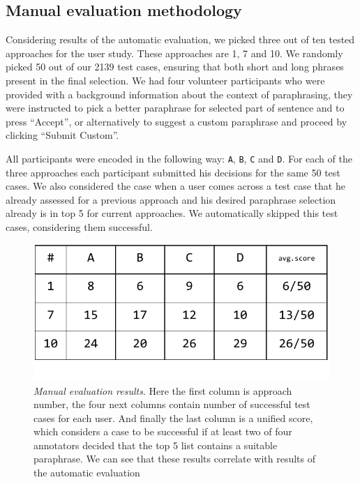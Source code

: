 \subsection{Manual evaluation methodology}

Considering results of the automatic evaluation, we picked three out of ten tested approaches for the user study. These approaches are 1, 7 and 10. We randomly picked 50 out of our 2139 test cases, ensuring that both short and long phrases present in the final selection. We had four volunteer participants who were provided with a background information about the context of paraphrasing, they were instructed to pick a better paraphrase for selected part of sentence and to press ``Accept'', or alternatively to suggest a custom paraphrase and proceed by clicking ``Submit Custom''. 

All participants were encoded in the following way: \texttt{A}, \texttt{B}, \texttt{C} and \texttt{D}. For each of the three approaches each participant submitted his decisions for the same 50 test cases. We also considered the case when a user comes across a test case that he already assessed for a previous approach and his desired paraphrase selection already is in top 5 for current approaches. We automatically skipped this test cases, considering them successful. 

\begin{figure}
 \centering 
 \includegraphics[scale=0.8]{g/man-eval-result.pdf}
 \caption{\emph{Manual evaluation results}. Here the first column is approach number, the four next columns contain number of successful test cases for each user. And finally the last column is a unified score, which considers a case to be successful if at least two of four annotators decided that the top 5 list contains a suitable paraphrase. We can see that these results correlate with results of the automatic evaluation}
\end{figure}


